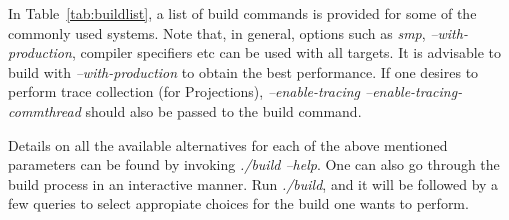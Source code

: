 In Table~\ref{tab:buildlist}, a list of build commands is provided for some of the commonly 
used systems. Note that, in general, options such as {\em smp}, {\em
--with-production}, compiler specifiers etc can be used with all targets. It is
advisable to build with {\em --with-production} to obtain the best performance.
If one desires to perform trace collection (for Projections), {\em
--enable-tracing --enable-tracing-commthread} should also be passed to the build command.

Details on all the available alternatives for each of the above mentioned
parameters can be found by invoking {\em ./build --help}. One can also go through the 
build process in an interactive manner. Run {\em ./build}, and it will be followed by 
a few queries to select appropiate choices for the build one wants to perform.


